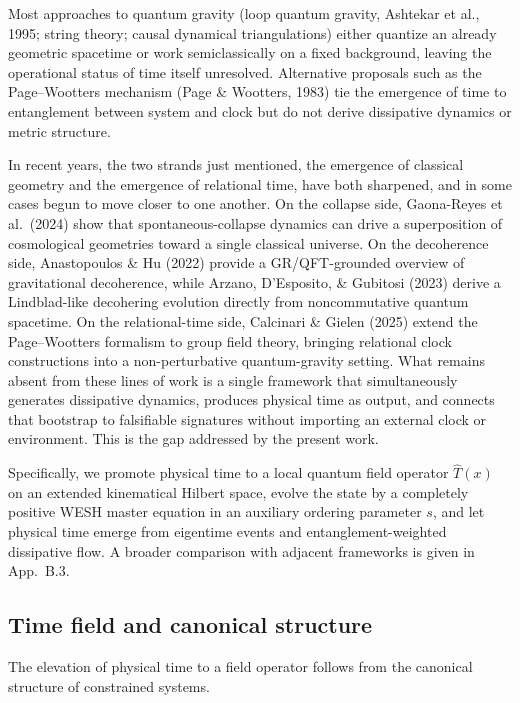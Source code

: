 \documentclass[12pt,a4paper]{article}
\numberwithin{equation}{section}
\begin{document}
Most approaches to quantum gravity (loop quantum gravity, Ashtekar et al., 1995; string
theory; causal dynamical triangulations) either quantize an already
geometric spacetime or work semiclassically on a fixed background, leaving
the operational status of time itself unresolved. Alternative proposals such
as the Page--Wootters mechanism (Page \& Wootters, 1983) tie the emergence
of time to entanglement between system and clock but do not derive
dissipative dynamics or metric structure. 

\noindent In recent years, the two strands just mentioned, the emergence of
classical geometry and the emergence of relational time, have both
sharpened, and in some cases begun to move closer to one another. On the
collapse side, Gaona-Reyes et al.\ (2024) show that
spontaneous-collapse dynamics can drive a superposition of cosmological
geometries toward a single classical universe. On the decoherence side,
Anastopoulos \& Hu (2022) provide a GR/QFT-grounded
overview of gravitational decoherence, while Arzano, D'Esposito, \&
Gubitosi (2023) derive a Lindblad-like
decohering evolution directly from noncommutative quantum spacetime. On the
relational-time side, Calcinari \& Gielen (2025)
extend the Page--Wootters formalism to group field theory, bringing
relational clock constructions into a non-perturbative quantum-gravity
setting. What remains absent from these lines of work is a single framework
that simultaneously generates dissipative dynamics, produces physical time
as output, and connects that bootstrap to falsifiable signatures without
importing an external clock or environment. This is the gap addressed by
the present work.

\noindent Specifically, we promote physical time to a local
quantum field operator $\hat T(x)$ on an extended kinematical Hilbert space, evolve
the state by a completely positive WESH master equation in an auxiliary
ordering parameter $s$, and let physical time emerge
from eigentime events and entanglement-weighted dissipative flow. A broader comparison with adjacent frameworks is given in
App.~B.3.

\subsection{Time field and canonical structure}

The elevation of physical time to a field operator follows from the
canonical structure of constrained systems.
\end{document}
